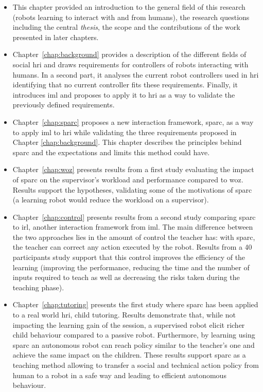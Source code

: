 \begin{itemize}
	\item This chapter provided an introduction to the general field of this research (robots learning to interact with and from humans), the research questions including the central \emph{thesis}, the scope and the contributions of the work presented in later chapters.  

	\item Chapter~\ref{chap:background} provides a description of the different fields of social \gls{hri} and draws requirements for controllers of robots interacting with humans. In a second part, it analyses the current robot controllers used in \gls{hri} identifying that no current controller fits these requirements. Finally, it introduces \gls{iml} and proposes to apply it to \gls{hri} as a way to validate the previously defined requirements.
	
	\item Chapter~\ref{chap:sparc} proposes a new interaction framework, \gls{sparc}, as a way to apply \gls{iml} to \gls{hri} while validating the three requirements proposed in Chapter \ref{chap:background}. This chapter describes the principles behind \gls{sparc} and the expectations and limits this method could have.
	
	\item Chapter~\ref{chap:woz} presents results from a first study evaluating the impact of \gls{sparc} on the supervisor's workload and performance compared to \gls{woz}. Results support the hypotheses, validating some of the motivations of \gls{sparc} (a learning robot would reduce the workload on a supervisor).
	
	\item Chapter~\ref{chap:control} presents results from a second study comparing \gls{sparc} to \gls{irl}, another interaction framework from \gls{iml}. The main difference between the two approaches lies in the amount of control the teacher has: with \gls{sparc}, the teacher can correct any action executed by the robot. Results from a 40 participants study support that this control improves the efficiency of the learning (improving the performance, reducing the time and the number of inputs required to teach as well as decreasing the risks taken during the teaching phase).
	
	\item Chapter~\ref{chap:tutoring} presents the first study where \gls{sparc} has been applied to a real world \gls{hri}, child tutoring. Results demonstrate that, while not impacting the learning gain of the session, a supervised robot elicit richer child behaviour compared to a passive robot. Furthermore, by learning using \gls{sparc} an autonomous robot can reach policy similar to the teacher's one and achieve the same impact on the children. These results support \gls{sparc} as a teaching method allowing to transfer a social and technical action policy from human to a robot in a safe way and leading to efficient autonomous behaviour.
	

\end{itemize}
